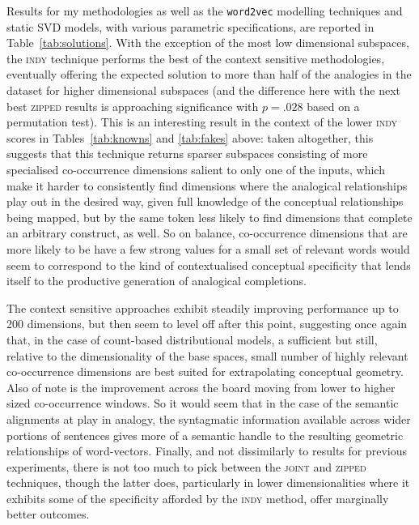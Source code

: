 Results for my methodologies as well as the \texttt{word2vec} modelling techniques and static SVD models, with various parametric specifications, are reported in Table~\ref{tab:solutions}.  With the exception of the most low dimensional subspaces, the \textsc{indy} technique performs the best of the context sensitive methodologies, eventually offering the expected solution to more than half of the analogies in the dataset for higher dimensional subspaces (and the difference here with the next best \textsc{zipped} results is approaching significance with $p = .028$ based on a permutation test).  This is an interesting result in the context of the lower \textsc{indy} scores in Tables~\ref{tab:knowns} and \ref{tab:fakes} above: taken altogether, this suggests that this technique returns sparser subspaces consisting of more specialised co-occurrence dimensions salient to only one of the inputs, which make it harder to consistently find dimensions where the analogical relationships play out in the desired way, given full knowledge of the conceptual relationships being mapped, but by the same token less likely to find dimensions that complete an arbitrary construct, as well.  So on balance, co-occurrence dimensions that are more likely to be have a few strong values for a small set of relevant words would seem to correspond to the kind of contextualised conceptual specificity that lends itself to the productive generation of analogical completions.

The context sensitive approaches exhibit steadily improving performance up to 200 dimensions, but then seem to level off after this point, suggesting once again that, in the case of count-based distributional models, a sufficient but still, relative to the dimensionality of the base spaces, small number of highly relevant co-occurrence dimensions are best suited for extrapolating conceptual geometry.  Also of note is the improvement across the board moving from lower to higher sized co-occurrence windows.  So it would seem that in the case of the semantic alignments at play in analogy, the syntagmatic information available across wider portions of sentences gives more of a semantic handle to the resulting geometric relationships of word-vectors.  Finally, and not dissimilarly to results for previous experiments, there is not too much to pick between the \textsc{joint} and \textsc{zipped} techniques, though the latter does, particularly in lower dimensionalities where it exhibits some of the specificity afforded by the \textsc{indy} method, offer marginally better outcomes.

